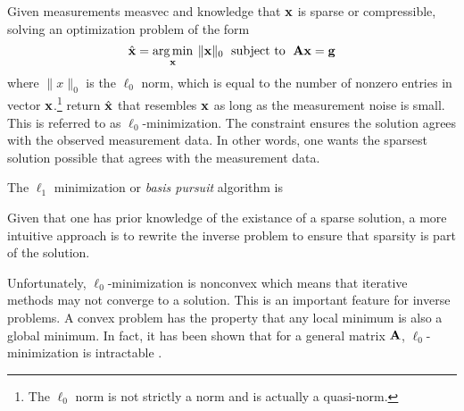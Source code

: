 Given measurements \gls{measvec} and knowledge that $\mathbf{x}$ is sparse or compressible, solving an optimization problem of the form 
\begin{equation}
	\hat{ \mathbf{x} } = \operatorname*{arg\,min}_{\mathbf{x}} \: \| \mathbf{x} \|_{0} \text{\; subject to \;} \mathbf{A}\mathbf{x} = \mathbf{g}
	\label{eq:l0min}
\end{equation}
where $\| x \|_{0}$ is the $\ell_0$ norm, which is equal to the number of nonzero entries in vector $\mathbf{x}$.\footnote{The $\ell_0$ norm is not strictly a norm and is actually a quasi-norm.}  return $\hat{ \mathbf{x} }$ that resembles $\mathbf{x}$ as long as the measurement noise is small. This is referred to as $\ell_0$-minimization. The constraint ensures the solution agrees with the observed measurement data. In other words, one wants the sparsest solution possible that agrees with the measurement data. 


The $\ell_1$ minimization or \emph{basis pursuit} algorithm is 



Given that one has prior knowledge of the existance of a sparse solution, a more intuitive approach is to rewrite the inverse problem to ensure that sparsity is part of the solution. 


Unfortunately, $\ell_0$-minimization is nonconvex which means that iterative methods may not converge to a solution. This is an important feature for inverse problems. A convex problem has the property that any local minimum is also a global minimum. In fact, it has been shown that for a general matrix $\mathbf{A}$, $\ell_0$- minimization is intractable \cite{aggarwal2007data}. 

